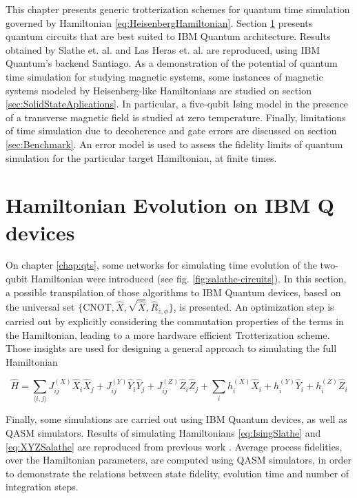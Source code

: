This chapter presents generic trotterization schemes for quantum time simulation governed by Hamiltonian \ref{eq:HeisenbergHamiltonian}. Section \ref{sec:MainCircuits} presents quantum circuits that are best suited to IBM Quantum architecture. Results obtained by Slathe et. al. \cite{HeisenbergSimulLasHeras} and Las Heras et. al. \cite{HubbardSimulLasHeras} are reproduced, using IBM Quantum's backend Santiago. As a demonstration of the potential of quantum time simulation for studying magnetic systems, some instances of magnetic systems modeled by Heisenberg-like Hamiltonians are studied on section \ref{sec:SolidStateAplications}. In particular, a five-qubit Ising model in the presence of a transverse magnetic field is studied at zero temperature. Finally, limitations of time simulation due to decoherence and gate errors are discussed on section \ref{sec:Benchmark}. An error model is used to assess the fidelity limits of quantum simulation for the particular target Hamiltonian, at finite times.

\section{Hamiltonian Evolution on IBM Q devices}
\label{sec:MainCircuits}
  
  On chapter \ref{chap:qts}, some networks for simulating time evolution of the two-qubit Hamiltonian were introduced (see fig. \ref{fig:salathe-circuits}). In this section, a possible transpilation of those algorithms to IBM Quantum devices, based on the universal set $\{\text{CNOT}, \hat{X}, \sqrt{\hat{X}}, \hat{R}_{\hat{z}, \phi}\}$, is presented. An optimization step is carried out by explicitly considering the commutation properties of the terms in the Hamiltonian, leading to a more hardware efficient Trotterization scheme. Those insights are used for designing a general approach to simulating the full Hamiltonian 

  \begin{equation}
    \hat{H} = \sum_{\langle i,j \rangle} J_{ij}^{(X)} \hat{X}_i \hat{X}_j + J_{ij}^{(Y)} \hat{Y}_i \hat{Y}_j + J_{ij}^{(Z)} \hat{Z}_i \hat{Z}_j + \sum_i h_i^{(X)} \hat{X}_i + h_i^{(Y)} \hat{Y}_i + h_i^{(Z)} \hat{Z}_i
    \label{eq:HeisenbergHamiltonian2}
  \end{equation}

  Finally, some simulations are carried out using IBM Quantum devices, as well as QASM simulators. Results of simulating Hamiltonians \ref{eq:IsingSlathe} and \ref{eq:XYZSalathe} are reproduced from previous work \cite{HeisenbergSimulLasHeras,HubbardSimulLasHeras}. Average process fidelities, over the Hamiltonian parameters, are computed using QASM simulators, in order to demonstrate the relations between state fidelity, evolution time and number of integration steps.

